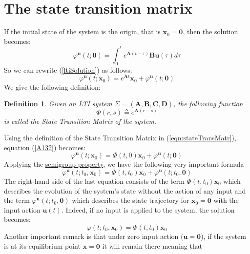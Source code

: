\documentclass[a4paper,10pt,oneside]{book}
\newtheorem{definition}{Definition}
\begin{document}
\section{The state transition matrix}
If the initial state of the system is the origin, that is $\mathbf{x}_0=\mathbf{0}$, then the solution becomes:
\begin{equation}
 \varphi^{\mathbf{u}}(t;\mathbf{0})=\int_0^t e^{\mathbf{A}(t-\tau)}\mathbf{Bu}(\tau)d\tau
\end{equation}
So we can rewrite (\ref{ltiSolution}) as follows:
\begin{equation}\label{A132}
 \varphi^{\mathbf{u}}(t;\mathbf{x}_0)=e^{\mathbf{A}t}\mathbf{x}_0+\varphi^{\mathbf{u}}(t;\mathbf{0})
\end{equation}
We give the following definition:
\begin{definition}\label{def:stateTransMatr}
 Given an LTI system $\Sigma=(\mathbf{A},\mathbf{B},\mathbf{C},\mathbf{D})$, the following function
\begin{equation}\label{eqn:stateTransMatr}
 \Phi(r,s)\triangleq e^{\mathbf{A}(r-s)}
\end{equation}
is called the State Transition Matrix of the system.
\end{definition}
Using the definition of the State Transition Matrix in (\ref{eqn:stateTransMatr}), equation (\ref{A132}) becomes:
\begin{equation}\label{X3901}
 \varphi^{\mathbf{u}}(t;\mathbf{x}_0)=\Phi(t,0)\mathbf{x}_0+\varphi^{\mathbf{u}}(t;\mathbf{0})
\end{equation}
Applying the \hyperlink{thm:semigroupProperty}{semigroup property}, we have the following very important formula
\begin{equation}
 \varphi^{\mathbf{u}}(t;t_0,\mathbf{x}_0)=\Phi(t,t_0)\mathbf{x}_0+\varphi^{\mathbf{u}}(t;t_0,\mathbf{0})
\end{equation}
The right-hand side of the last equation consists of the term $\Phi(t,t_0)\mathbf{x}_0$ which describes the evolution of the system's state without the action of any input and the term $\varphi^{\mathbf{u}}(t;t_0,\mathbf{0})$ which describes the state trajectory for $\mathbf{x}_0=\mathbf{0}$ with the input action $\mathbf{u}(t)$. Indeed, if no input is applied to the system, the solution becomes:
\begin{equation}
 \varphi(t;t_0,\mathbf{x}_0)=\Phi(t,t_0)\mathbf{x}_0
\end{equation}
Another important remark is that under zero input action ($\mathbf{u}=\mathbf{0}$), if the system is at its equilibrium point $\mathbf{x}=\mathbf{0}$ it will remain there meaning that
\end{document}
